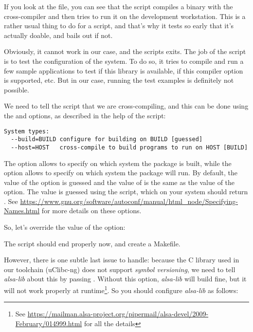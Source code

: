 If you look at the  file, you can see that the
 script compiles a binary with the cross-compiler
and then tries to run it on the development workstation. This is a
rather usual thing to do for a  script, and that's
why it tests so early that it's actually doable, and bails out if not.

Obviously, it cannot work in our case, and the scripts exits. The job
of the  script is to test the configuration of the system. To
do so, it tries to compile and run a few sample applications to test
if this library is available, if this compiler option is supported,
etc. But in our case, running the test examples is definitely not
possible.

We need to tell the  script that we are cross-compiling, and
this can be done using the  and  options,
as described in the help of the  script:

\begin{verbatim}
System types:
  --build=BUILD	configure for building on BUILD [guessed]
  --host=HOST	cross-compile to build programs to run on HOST [BUILD]
\end{verbatim}

The  option allows to specify on which system the
package is built, while the  option allows to specify on
which system the package will run. By default, the value of the
 option is guessed and the value of  is the
same as the value of the  option. The value is guessed
using the  script, which on your system should
return . See
\url{https://www.gnu.org/software/autoconf/manual/html_node/Specifying-Names.html}
for more details on these options.

So, let's override the value of the  option:


The  script should end properly now, and create a
Makefile.

However, there is one subtle last issue to handle: because the C
library used in our toolchain (uClibc-ng) does not support {\em symbol
versioning}, we need to tell {\em alsa-lib} about this by passing
. Without this option, {\em alsa-lib} will
build fine, but it will not work properly at runtime\footnote{See
\url{https://mailman.alsa-project.org/pipermail/alsa-devel/2009-February/014999.html}
for all the details}. So you should configure {\em alsa-lib} as
follows:

